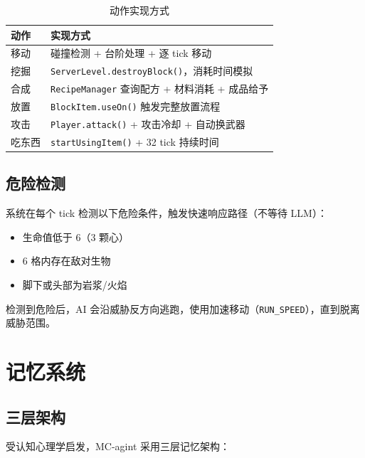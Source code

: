 \documentclass[12pt,a4paper]{article}
\begin{document}
\begin{table}[H]
\centering
\caption{动作实现方式}
\label{tab:actions}
\begin{tabular}{@{}ll@{}}
\toprule
\textbf{动作} & \textbf{实现方式} \\
\midrule
移动 & 碰撞检测 + 台阶处理 + 逐 tick 移动 \\
挖掘 & \texttt{ServerLevel.destroyBlock()}，消耗时间模拟 \\
合成 & \texttt{RecipeManager} 查询配方 + 材料消耗 + 成品给予 \\
放置 & \texttt{BlockItem.useOn()} 触发完整放置流程 \\
攻击 & \texttt{Player.attack()} + 攻击冷却 + 自动换武器 \\
吃东西 & \texttt{startUsingItem()} + 32 tick 持续时间 \\
\bottomrule
\end{tabular}
\end{table}

\subsection{危险检测}

系统在每个 tick 检测以下危险条件，触发快速响应路径（不等待 LLM）：

\begin{itemize}
    \item 生命值低于 6（3 颗心）
    \item 6 格内存在敌对生物
    \item 脚下或头部为岩浆/火焰
\end{itemize}

检测到危险后，AI 会沿威胁反方向逃跑，使用加速移动（\texttt{RUN\_SPEED}），直到脱离威胁范围。

\section{记忆系统}

\subsection{三层架构}

受认知心理学启发，MC-agint 采用三层记忆架构：
\end{document}
